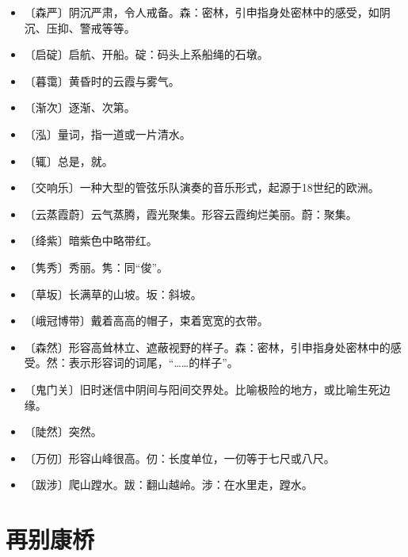 \documentclass[12pt,UTF-8,openany]{ctexbook}
\begin{document}
\begin{itemize}
    \setlength\itemsep{-0.2em}
    \item 〔森严〕阴沉严肃，令人戒备。森：密林，引申指身处密林中的感受，如阴沉、压抑、警戒等等。
    \item 〔启碇〕启航、开船。碇：码头上系船绳的石墩。
    \item 〔暮霭〕黄昏时的云霞与雾气。
    \item 〔渐次〕逐渐、次第。
    \item 〔泓〕量词，指一道或一片清水。
    \item 〔辄〕总是，就。
    \item 〔交响乐〕一种大型的管弦乐队演奏的音乐形式，起源于18世纪的欧洲。
    \item 〔云蒸霞蔚〕云气蒸腾，霞光聚集。形容云霞绚烂美丽。蔚：聚集。
    \item 〔绛紫〕暗紫色中略带红。
    \item 〔隽秀〕秀丽。隽：同“俊”。
    \item 〔草坂〕长满草的山坡。坂：斜坡。
    \item 〔峨冠博带〕戴着高高的帽子，束着宽宽的衣带。
    \item 〔森然〕形容高耸林立、遮蔽视野的样子。森：密林，引申指身处密林中的感受。然：表示形容词的词尾，“……的样子”。
    \item 〔鬼门关〕旧时迷信中阴间与阳间交界处。比喻极险的地方，或比喻生死边缘。
    \item 〔陡然〕突然。
    \item 〔万仞〕形容山峰很高。仞：长度单位，一仞等于七尺或八尺。
    \item 〔跋涉〕爬山蹚水。跋：翻山越岭。涉：在水里走，蹚水。
\end{itemize}

\chapter{再别康桥}
\end{document}
